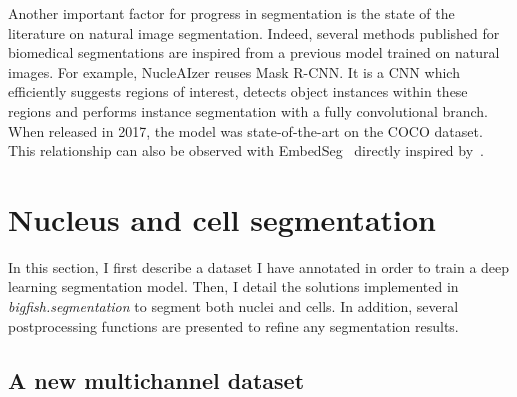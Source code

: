 Another important factor for progress in segmentation is the state of the literature on natural image segmentation.
Indeed, several methods published for biomedical segmentations are inspired from a previous model trained on natural images.
For example, NucleAIzer reuses Mask R-CNN.
It is a \ac{CNN} which efficiently suggests regions of interest, detects object instances within these regions and performs instance segmentation with a fully convolutional branch.
When released in 2017, the model was state-of-the-art on the COCO dataset.
This relationship can also be observed with EmbedSeg~\cite{Lalit_2021} directly inspired by~\cite{Neven_2019_CVPR}.

\section{Nucleus and cell segmentation}
\label{sec:segmentation_nuc_cell}

In this section, I first describe a dataset I have annotated in order to train a deep learning segmentation model.
Then, I detail the solutions implemented in \emph{bigfish.segmentation} to segment both nuclei and cells.
In addition, several postprocessing functions are presented to refine any segmentation results.

\subsection{A new multichannel dataset}
\label{subsec:segmentation_data}

